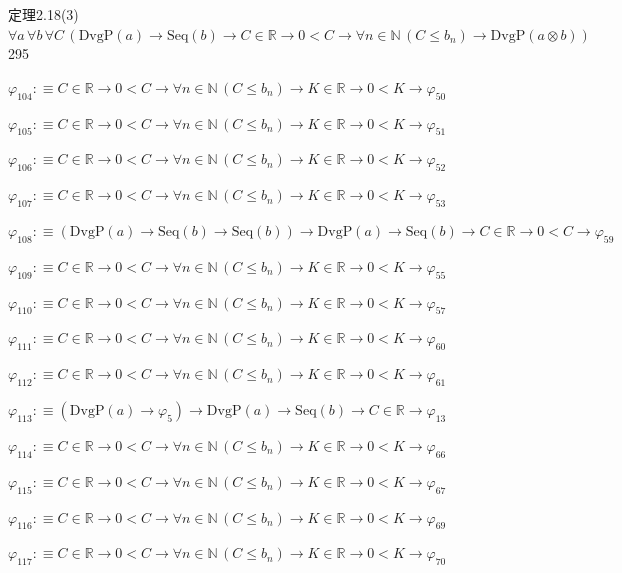 \begin{fullproof}{定理2.18(3)}{$\forall a\,\forall b\,\forall C\,(\mathrm{DvgP}(a) \to \mathrm{Seq}(b) \to C \in \mathbb{R} \to 0 < C \to \forall n \in \mathbb{N}\,(C \leq b_{n}) \to \mathrm{DvgP}(a \otimes b))$}{295}
\begin{abbrevlist}
\item $\varphi_{104} :\equiv C \in \mathbb{R} \to 0 < C \to \forall n \in \mathbb{N}\,(C \leq b_{n}) \to K \in \mathbb{R} \to 0 < K \to \varphi_{50}$
\item $\varphi_{105} :\equiv C \in \mathbb{R} \to 0 < C \to \forall n \in \mathbb{N}\,(C \leq b_{n}) \to K \in \mathbb{R} \to 0 < K \to \varphi_{51}$
\item $\varphi_{106} :\equiv C \in \mathbb{R} \to 0 < C \to \forall n \in \mathbb{N}\,(C \leq b_{n}) \to K \in \mathbb{R} \to 0 < K \to \varphi_{52}$
\item $\varphi_{107} :\equiv C \in \mathbb{R} \to 0 < C \to \forall n \in \mathbb{N}\,(C \leq b_{n}) \to K \in \mathbb{R} \to 0 < K \to \varphi_{53}$
\item $\varphi_{108} :\equiv (\mathrm{DvgP}(a) \to \mathrm{Seq}(b) \to \mathrm{Seq}(b)) \to \mathrm{DvgP}(a) \to \mathrm{Seq}(b) \to C \in \mathbb{R} \to 0 < C \to \varphi_{59}$
\item $\varphi_{109} :\equiv C \in \mathbb{R} \to 0 < C \to \forall n \in \mathbb{N}\,(C \leq b_{n}) \to K \in \mathbb{R} \to 0 < K \to \varphi_{55}$
\item $\varphi_{110} :\equiv C \in \mathbb{R} \to 0 < C \to \forall n \in \mathbb{N}\,(C \leq b_{n}) \to K \in \mathbb{R} \to 0 < K \to \varphi_{57}$
\item $\varphi_{111} :\equiv C \in \mathbb{R} \to 0 < C \to \forall n \in \mathbb{N}\,(C \leq b_{n}) \to K \in \mathbb{R} \to 0 < K \to \varphi_{60}$
\item $\varphi_{112} :\equiv C \in \mathbb{R} \to 0 < C \to \forall n \in \mathbb{N}\,(C \leq b_{n}) \to K \in \mathbb{R} \to 0 < K \to \varphi_{61}$
\item $\varphi_{113} :\equiv (\mathrm{DvgP}(a) \to \varphi_{5}) \to \mathrm{DvgP}(a) \to \mathrm{Seq}(b) \to C \in \mathbb{R} \to \varphi_{13}$
\item $\varphi_{114} :\equiv C \in \mathbb{R} \to 0 < C \to \forall n \in \mathbb{N}\,(C \leq b_{n}) \to K \in \mathbb{R} \to 0 < K \to \varphi_{66}$
\item $\varphi_{115} :\equiv C \in \mathbb{R} \to 0 < C \to \forall n \in \mathbb{N}\,(C \leq b_{n}) \to K \in \mathbb{R} \to 0 < K \to \varphi_{67}$
\item $\varphi_{116} :\equiv C \in \mathbb{R} \to 0 < C \to \forall n \in \mathbb{N}\,(C \leq b_{n}) \to K \in \mathbb{R} \to 0 < K \to \varphi_{69}$
\item $\varphi_{117} :\equiv C \in \mathbb{R} \to 0 < C \to \forall n \in \mathbb{N}\,(C \leq b_{n}) \to K \in \mathbb{R} \to 0 < K \to \varphi_{70}$

\end{abbrevlist}
\end{fullproof}
